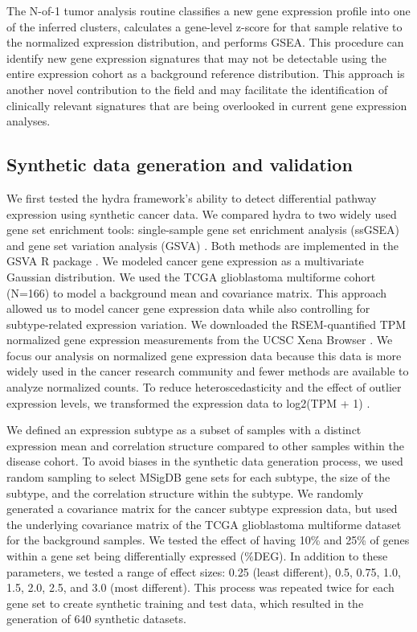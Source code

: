 \documentclass[10pt,letterpaper]{article}
\begin{document}
The N-of-1 tumor analysis routine classifies a new gene expression profile into one of the inferred clusters, calculates a gene-level z-score for that sample relative to the normalized expression distribution, and performs GSEA. This procedure can identify new gene expression signatures that may not be detectable using the entire expression cohort as a background reference distribution. This approach is another novel contribution to the field and may facilitate the identification of clinically relevant signatures that are being overlooked in current gene expression analyses.

\subsection*{Synthetic data generation and validation}
We first tested the hydra framework’s ability to detect differential pathway expression using synthetic cancer data. We compared hydra to two widely used gene set enrichment tools: single-sample gene set enrichment analysis (ssGSEA) and gene set variation analysis (GSVA) \cite{barbieSystematicRNAInterference2009, hanzelmannGSVAGeneSet2013, tarcaComparisonGeneSet2013}. Both methods are implemented in the GSVA R package \cite{hanzelmannGSVAGeneSet2013}. We modeled cancer gene expression as a multivariate Gaussian distribution. We used the TCGA glioblastoma multiforme cohort (N=166) to model a background mean and covariance matrix. This approach allowed us to model cancer gene expression data while also controlling for subtype-related expression variation. We downloaded the RSEM-quantified TPM normalized gene expression measurements from the UCSC Xena Browser \cite{goldmanUCSCXenaPlatform2018}. We focus our analysis on normalized gene expression data because this data is more widely used in the cancer research community and fewer methods are available to analyze normalized counts. To reduce heteroscedasticity and the effect of outlier expression levels, we transformed the expression data to log2(TPM + 1) \cite{zwienerTransformingRNASeqData2014}. 

We defined an expression subtype as a subset of samples with a distinct expression mean and correlation structure compared to other samples within the disease cohort. To avoid biases in the synthetic data generation process, we used random sampling to select MSigDB gene sets for each subtype, the size of the subtype, and the correlation structure within the subtype. We randomly generated a covariance matrix for the cancer subtype expression data, but used the underlying covariance matrix of the TCGA glioblastoma multiforme dataset for the background samples. We tested the effect of having 10\% and 25\% of genes within a gene set being differentially expressed (\%DEG). In addition to these parameters, we tested a range of effect sizes: 0.25 (least different), 0.5, 0.75, 1.0, 1.5, 2.0, 2.5, and 3.0 (most different). This process was repeated twice for each gene set to create synthetic training and test data, which resulted in the generation of 640 synthetic datasets. 
\end{document}
